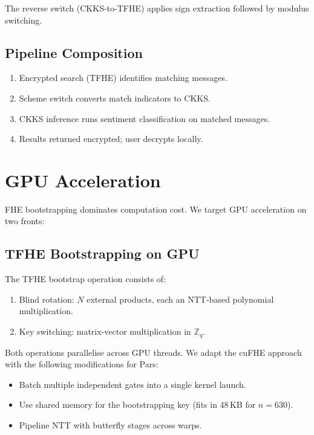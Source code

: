 \documentclass[11pt,a4paper]{article}
\begin{document}
The reverse switch (CKKS-to-TFHE) applies sign extraction followed by
modulus switching.

\subsection{Pipeline Composition}

\begin{enumerate}
    \item Encrypted search (TFHE) identifies matching messages.
    \item Scheme switch converts match indicators to CKKS.
    \item CKKS inference runs sentiment classification on matched messages.
    \item Results returned encrypted; user decrypts locally.
\end{enumerate}

\section{GPU Acceleration}
\label{sec:gpu}

FHE bootstrapping dominates computation cost.  We target GPU acceleration
on two fronts:

\subsection{TFHE Bootstrapping on GPU}

The TFHE bootstrap operation consists of:
\begin{enumerate}
    \item Blind rotation: $N$ external products, each an NTT-based
    polynomial multiplication.
    \item Key switching: matrix-vector multiplication in $\mathbb{Z}_q$.
\end{enumerate}

Both operations parallelise across GPU threads.  We adapt the cuFHE
approach~\cite{dai2018cufhe} with the following modifications for Pars:

\begin{itemize}
    \item Batch multiple independent gates into a single kernel launch.
    \item Use shared memory for the bootstrapping key (fits in 48\,KB
    for $n = 630$).
    \item Pipeline NTT with butterfly stages across warps.
\end{itemize}
\end{document}
